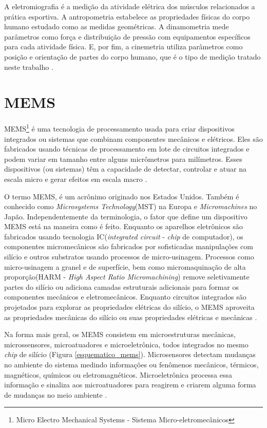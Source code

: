A eletromiografia é a medição da atividade elétrica dos músculos relacionados a prática esportiva. A antropometria estabelece as propriedades físicas do corpo humano estudado como as medidas geométricas. A dinamometria mede parâmetros como força e distribuição de pressão com equipamentos específicos para cada atividade física. E, por fim, a cinemetria utiliza parâmetros como posição e orientação de partes do corpo humano, que é o tipo de medição tratado neste trabalho \cite{amadio2007}\cite{medeiros2013}.
	
	\section{MEMS}

		MEMS\footnote{Micro Electro Mechanical Systems - Sistema Micro-eletromecânicos}  é uma tecnologia de processamento usada para criar dispositivos integrados ou sistemas que combinam componentes mecânicos e elétricos. Eles são fabricados usando técnicas de processamento em lote de circuitos integrados e podem variar em tamanho entre alguns micrômetros para milímetros. Esses dispositivos (ou sistemas) têm a capacidade de detectar, controlar e atuar na escala micro e gerar efeitos em escala macro \cite{prime2002}. 

		O termo MEMS, é um acrônimo originado nos Estados Unidos. Também é conhecido como \textit{Microsystems Technology}(MST) na Europa e \textit{Micromachines} no Japão. Independentemente da terminologia, o fator que define um dispositivo MEMS está na maneira como é feito. Enquanto os aparelhos eletrônicos são fabricados usando tecnologia IC(\textit{integrated circuit} - \textit{chip} de computador), os componentes micromecânicos são fabricados por sofisticadas manipulações com silício e outros substratos usando processos de micro-usinagem. Processos como micro-usinagem a granel e de superfície, bem como micromaquinação de alta proporção(HARM - \textit{High Aspect Ratio Micromachining}) remove seletivamente partes do silício ou adiciona camadas estruturais adicionais para formar os componentes mecânicos e eletromecânicos. Enquanto circuitos integrados são projetados para explorar as propriedades elétricas do silício, o MEMS aproveita as propriedades mecânicas do silício ou suas propriedades elétricas e mecânicas \cite{prime2002}.

		Na forma mais geral, os MEMS consistem em microestruturas mecânicas, microssensores, microatuadores e microeletrônica, todos integrados no mesmo \textit{chip} de silício (Figura \ref{esquematico_mems}). Microsensores detectam mudanças no ambiente do sistema medindo informações ou fenômenos mecânicos, térmicos, magnéticos, químicos ou eletromagnéticos. Microeletrônica processa essa informação e sinaliza aos microatuadores para reagirem e criarem alguma forma de mudanças no meio ambiente \cite{prime2002}.

